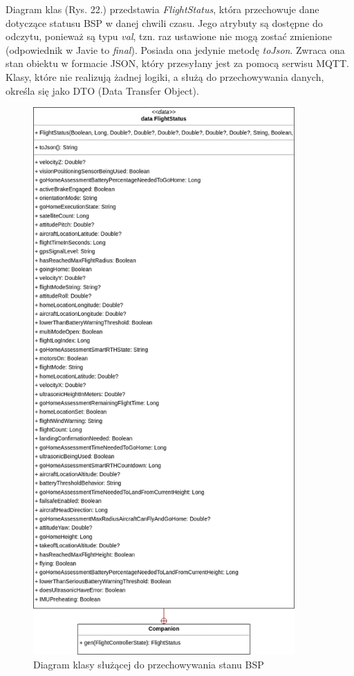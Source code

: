 Diagram klas (Rys. 22.) przedstawia \textit{FlightStatus}, która przechowuje dane dotyczące statusu BSP w danej chwili czasu. Jego atrybuty są dostępne do odczytu, ponieważ są typu \textit{val}, tzn. raz ustawione nie mogą zostać zmienione (odpowiednik w Javie to \textit{final}). Posiada ona jedynie metodę \textit{toJson}. Zwraca ona stan obiektu w formacie JSON, który przesyłany jest za pomocą serwisu MQTT. Klasy, które nie realizują żadnej logiki, a służą do przechowywania danych, określa się jako DTO (Data Transfer Object).

\begin{figure}[!htbp]
  \centering
  \includegraphics[width=10cm]{./Obrazy/FlightStatus.png}
  \caption{Diagram klasy służącej do przechowywania stanu BSP}
  \end{figure}

